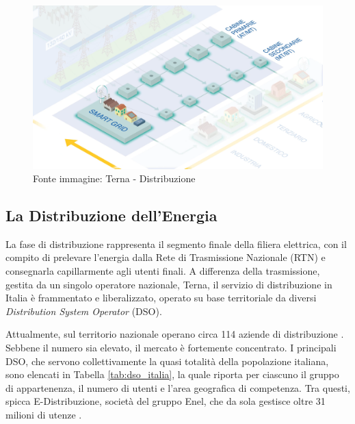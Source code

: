 \begin{figure}[b]
    \centering
    \includegraphics[width=0.5\linewidth]{img/Terna-Distribuzione.png}
    \caption{Fonte immagine: Terna - Distribuzione}
\end{figure}

\subsection{La Distribuzione dell'Energia}


La fase di distribuzione rappresenta il segmento finale della filiera elettrica, con il compito di prelevare l'energia dalla Rete di Trasmissione Nazionale (RTN) e consegnarla capillarmente agli utenti finali. A differenza della trasmissione, gestita da un singolo operatore nazionale, Terna, il servizio di distribuzione in Italia è frammentato e liberalizzato, operato su base territoriale da diversi \textit{Distribution System Operator} (DSO).


Attualmente, sul territorio nazionale operano circa 114 aziende di distribuzione \cite{arera-distributori}. Sebbene il numero sia elevato, il mercato è fortemente concentrato. I principali DSO, che servono collettivamente la quasi totalità della popolazione italiana, sono elencati in Tabella \ref{tab:dso_italia}, la quale riporta per ciascuno il gruppo di appartenenza, il numero di utenti e l'area geografica di competenza. Tra questi, spicca E-Distribuzione, società del gruppo Enel, che da sola gestisce oltre 31 milioni di utenze \cite{Clienti-sertivi-distribuzione}.


